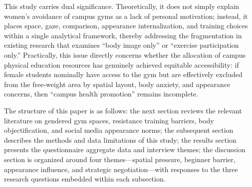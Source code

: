 This study carries dual significance.
Theoretically, it does not simply explain women's avoidance of campus gyms as a lack of personal motivation; instead, it places space, gaze, comparison, appearance internalization, and training choices within a single analytical framework, thereby addressing the fragmentation in existing research that examines ``body image only'' or ``exercise participation only.''
Practically, this issue directly concerns whether the allocation of campus physical education resources has genuinely achieved equitable accessibility:
if female students nominally have access to the gym but are effectively excluded from the free-weight area by spatial layout, body anxiety, and appearance concerns, then ``campus health promotion'' remains incomplete.

The structure of this paper is as follows: the next section reviews the relevant literature on gendered gym spaces, resistance training barriers, body objectification, and social media appearance norms; the subsequent section describes the methods and data limitations of this study; the results section presents the questionnaire aggregate data and interview themes; the discussion section is organized around four themes---spatial pressure, beginner barrier, appearance influence, and strategic negotiation---with responses to the three research questions embedded within each subsection.
